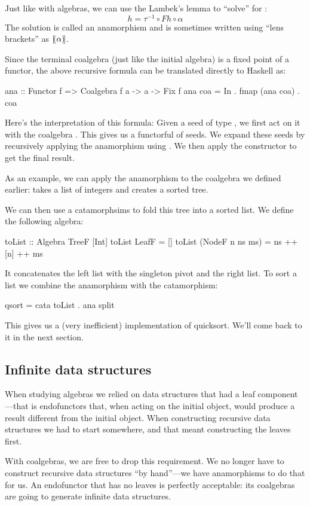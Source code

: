 \documentclass[DaoFP]{subfiles}
\begin{document}
 Just like with algebras, we can use the Lambek's lemma to ``solve'' for :
 \[ h = \tau^{-1} \circ F h \circ \alpha \]
 The solution is called an anamorphism and is sometimes written using \index{$\llens \rlens$}``lens brackets'' as $\mathopen{[\!(} \alpha \mathclose{)\!]}$.
 
 Since the terminal coalgebra (just like the initial algebra) is a fixed point of a functor, the above recursive formula can be translated directly to Haskell as:
 \begin{haskell}
ana :: Functor f => Coalgebra f a -> a -> Fix f
ana coa = In . fmap (ana coa) . coa 
\end{haskell}
Here's the interpretation of this formula: Given a seed of type , we first act on it with the coalgebra . This gives us a functorful of seeds. We expand these seeds by recursively applying the anamorphism using . We then apply the constructor  to get the final result.
 
As an example, we can apply the anamorphism to the  coalgebra we defined earlier:  takes a list of integers and creates a sorted tree. 

We can then use a catamorphsims to fold this tree into a sorted list. We define the following algebra:
\begin{haskell}
toList :: Algebra TreeF [Int]
toList LeafF = []
toList (NodeF n ns ms) = ns ++ [n] ++ ms
\end{haskell}
It concatenates the left list with the singleton pivot and the right list. To sort a list we combine the anamorphism with the catamorphism:
\begin{haskell}
qsort = cata toList . ana split
\end{haskell}
This gives us a (very inefficient) implementation of quicksort. We'll come back to it in the next section.

\subsection{Infinite data structures}

When studying algebras we relied on data structures that had a leaf component---that is endofunctors that, when acting on the initial object, would produce a result different from the initial object. When constructing recursive data structures we had to start somewhere, and that meant constructing the leaves first.

With coalgebras, we are free to drop this requirement. We no longer have to construct recursive data structures ``by hand''---we have anamorphisms to do that for us. An endofunctor that has no leaves is perfectly acceptable: its coalgebras are going to generate infinite data structures. 
\end{document}

